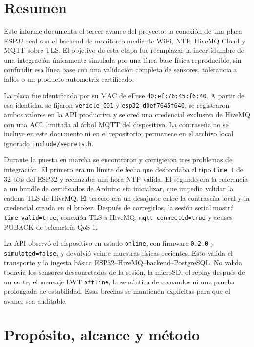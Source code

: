 \documentclass[10pt,a4paper]{article}
\newcommand{\code}[1]{\texttt{\small #1}}
\begin{document}

\section*{Resumen}

Este informe documenta el tercer avance del proyecto: la conexión de una placa
ESP32 real con el backend de monitoreo mediante WiFi, NTP, HiveMQ Cloud y MQTT
sobre TLS. El objetivo de esta etapa fue reemplazar la incertidumbre de una
integración únicamente simulada por una línea base física reproducible, sin
confundir esa línea base con una validación completa de sensores, tolerancia a
fallos o un producto automotriz certificado.

La placa fue identificada por su MAC de eFuse
\code{d0:ef:76:45:f6:40}. A partir de esa identidad se fijaron
\code{vehicle-001} y \code{esp32-d0ef7645f640}, se registraron ambos valores en
la API productiva y se creó una credencial exclusiva de HiveMQ con una ACL
limitada al árbol MQTT del dispositivo. La contraseña no se incluye en este
documento ni en el repositorio; permanece en el archivo local ignorado
\code{include/secrets.h}.

Durante la puesta en marcha se encontraron y corrigieron tres problemas de
integración. El primero era un límite de fecha que desbordaba el tipo
\code{time\_t} de 32 bits del ESP32 y rechazaba una hora NTP válida. El segundo
era la referencia a un bundle de certificados de Arduino sin inicializar, que
impedía validar la cadena TLS de HiveMQ. El tercero era un desajuste entre la
contraseña local y la credencial creada en el broker. Después de corregirlos,
la sesión serial mostró \code{time\_valid=true}, conexión TLS a HiveMQ,
\code{mqtt\_connected=true} y acuses PUBACK de telemetría QoS 1.

La API observó el dispositivo en estado \code{online}, con firmware \code{0.2.0}
y \code{simulated=false}, y devolvió veinte muestras físicas recientes. Esto
valida el transporte y la ingesta básica ESP32--HiveMQ--backend--PostgreSQL.
No valida todavía los sensores desconectados de la sesión, la microSD, el
replay después de un corte, el mensaje LWT \code{offline}, la semántica de
comandos ni una prueba prolongada de estabilidad. Esas brechas se mantienen
explícitas para que el avance sea auditable.

\section{Propósito, alcance y método}
\end{document}
